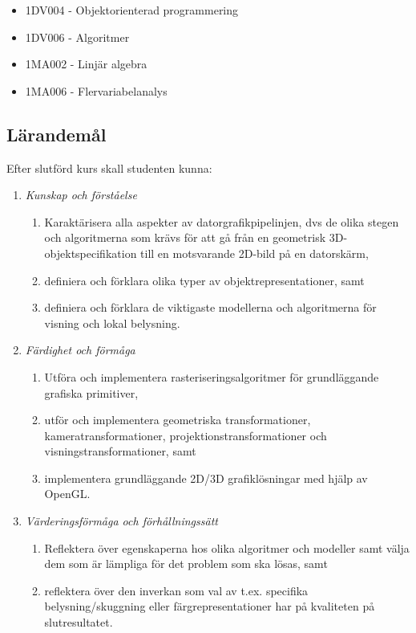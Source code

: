 \begin{itemize}
\tightlist
\item
  1DV004 - Objektorienterad programmering
\item
  1DV006 - Algoritmer
\item
  1MA002 - Linjär algebra
\item
  1MA006 - Flervariabelanalys
\end{itemize}

\subsection*{Lärandemål}

Efter slutförd kurs skall studenten kunna:

\begin{enumerate}
\def\labelenumi{\Alph{enumi}.}
\tightlist
\item
  \emph{Kunskap och förståelse}

  \begin{enumerate}
  \def\labelenumii{\Alph{enumi}.\arabic{enumii}.}
  \tightlist
  \item
    Karaktärisera alla aspekter av datorgrafikpipelinjen, dvs de olika
    stegen och algoritmerna som krävs för att gå från en geometrisk
    3D-objektspecifikation till en motsvarande 2D-bild på en datorskärm,
  \item
    definiera och förklara olika typer av objektrepresentationer, samt
  \item
    definiera och förklara de viktigaste modellerna och algoritmerna för
    visning och lokal belysning.
  \end{enumerate}
\item
  \emph{Färdighet och förmåga}

  \begin{enumerate}
  \def\labelenumii{\Alph{enumi}.\arabic{enumii}.}
  \tightlist
  \item
    Utföra och implementera rasteriseringsalgoritmer för grundläggande
    grafiska primitiver,
  \item
    utför och implementera geometriska transformationer,
    kameratransformationer, projektionstransformationer och
    visningstransformationer, samt
  \item
    implementera grundläggande 2D/3D grafiklösningar med hjälp av
    OpenGL.
  \end{enumerate}
\item
  \emph{Värderingsförmåga och förhållningssätt}

  \begin{enumerate}
  \def\labelenumii{\Alph{enumi}.\arabic{enumii}.}
  \tightlist
  \item
    Reflektera över egenskaperna hos olika algoritmer och modeller samt
    välja dem som är lämpliga för det problem som ska lösas, samt
  \item
    reflektera över den inverkan som val av t.ex. specifika
    belysning/skuggning eller färgrepresentationer har på kvaliteten på
    slutresultatet.
  \end{enumerate}
\end{enumerate}

